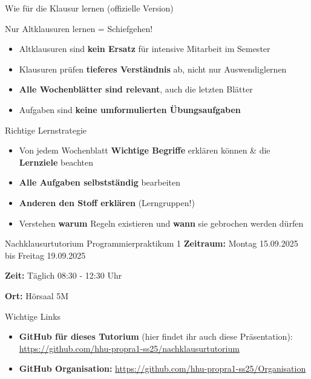 \begin{frame}{Wie für die Klausur lernen (offizielle Version)}
  \begin{alertblock}{Nur Altklausuren lernen = Schiefgehen!}
    \begin{itemize}
      \item Altklausuren sind \textbf{kein Ersatz} für intensive Mitarbeit im Semester
      \item Klausuren prüfen \textbf{tieferes Verständnis} ab, nicht nur Auswendiglernen
      \item \textbf{Alle Wochenblätter sind relevant}, auch die letzten Blätter
      \item Aufgaben sind \textbf{keine umformulierten Übungsaufgaben}
    \end{itemize}
  \end{alertblock}

  \begin{exampleblock}{Richtige Lernstrategie}
    \begin{itemize}
      \item Von jedem Wochenblatt \textbf{Wichtige Begriffe} erklären können \& die \textbf{Lernziele} beachten
      \item \textbf{Alle Aufgaben selbstständig} bearbeiten
      \item \textbf{Anderen den Stoff erklären} (Lerngruppen!)
      \item Verstehen \textbf{warum} Regeln existieren und \textbf{wann} sie gebrochen werden dürfen
    \end{itemize}
  \end{exampleblock}
\end{frame}

\begin{frame}{Nachklausurtutorium Programmierpraktikum 1}
  \textbf{Zeitraum:} Montag 15.09.2025 bis Freitag 19.09.2025

  \textbf{Zeit:} Täglich 08:30 - 12:30 Uhr

  \textbf{Ort:} Hörsaal 5M

  \vspace{0.5cm}

  \begin{exampleblock}{Wichtige Links}
    \begin{itemize}
      \item \textbf{GitHub für dieses Tutorium} (hier findet ihr auch diese Präsentation): \url{https://github.com/hhu-propra1-ss25/nachklausurtutorium}
      \item \textbf{GitHub Organisation:} \url{https://github.com/hhu-propra1-ss25/Organisation}
    \end{itemize}
  \end{exampleblock}
\end{frame}

